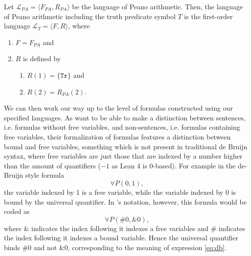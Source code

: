 \begin{definition}\label{def:lt}
    \leanok
    Let $\mathcal{L}_{PA} = \langle F_{PA},R_{PA}\rangle$ be the language of Peano arithmetic. Then, the language of Peano arithmetic including the truth predicate symbol $T$ is the first-order language $\mathcal{L}_T = \langle F, R \rangle$, where
    \begin{enumerate}
        \item $F = F_{PA}$ and
        \item $R$ is defined by
        \begin{enumerate}
            \item $R(1) = \{\texttt{Tr}\}$ and
            \item $R(2) = R_{PA}(2)$.
        \end{enumerate}
    \end{enumerate}
\end{definition}

We can then work our way up to the level of formulas constructed using our specified languages. As \cite{ffl} want to be able to make a distinction between sentences, i.e. formulas without free variables, and non-sentences, i.e. formulas containing free variables, their formalization of formulas features a distinction between bound and free variables, something which is not present in traditional de Bruijn syntax, where free variables are just those that are indexed by a number higher than the amount of quantifiers ($-1$ as Lean 4 is 0-based). For example in the de-Bruijn style formula 
\begin{equation}
\forall P(0,1),
\label{eq:db}
\end{equation}
the variable indexed by 1 is a free variable, while the variable indexed by 0 is bound by the universal quantifier. In \cite{ffl}'s notation, however, this formula would be coded as
\begin{equation}
\forall P(\#0,\&0),
\label{eq:ffl}
\end{equation}
where \& indicates the index following it indexes a free variables and \# indicates the index following it indexes a bound variable. Hence the universal quantifier binds \#0 and not \&0, corresponding to the meaning of expression \ref{eq:db}.

